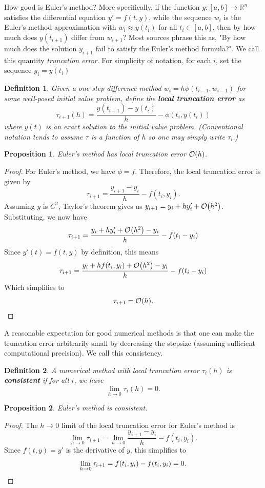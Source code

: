 \documentclass{article}
\newtheorem{definition}{Definition}[section]
\newtheorem{proposition}{Proposition}[section]
\newcommand{\R}{\mathbb{R}}
\newcommand{\0}{\vb{0}}
\begin{document}
How good is Euler's method? More specifically, if the function $y: [a, b]\to\R^n$ satisfies the differential equation $y' = f(t, y)$, while the sequence $w_i$ is the Euler's method approximation with $w_i \approx y(t_i)$ for all $t_i \in [a,b]$, then by how much does $y(t_{i+1})$ differ from $w_{i+1}$? Most sources phrase this as, "By how much does the solution $y_{i+1}$ fail to satisfy the Euler's method formula?". We call this quantity \emph{truncation error}. For simplicity of notation, for each $i$, set the sequence $y_i = y(t_i)$
\begin{definition}
  Given a one-step difference method $w_i = h\phi(t_{i-1}, w_{i-1})$ for some well-posed initial value problem, define the \textbf{local truncation error} as
  \[\tau_{i+1}(h) = \frac{y(t_{i+1}) - y(t_i)}{h} - \phi(t_i, y(t_i))\]
  where $y(t)$ is an exact solution to the initial value problem. (Conventional notation tends to assume $\tau$ is a function of $h$ so one may simply write $\tau_i$.)
\end{definition}

\begin{proposition}
  Euler's method has local truncation error $\order{h}$.
\end{proposition}
\begin{proof}
  For Euler's method, we have $\phi = f$. Therefore, the local truncation error is given by
  \[\tau_{i+1} = \frac{y_{i+1} - y_i}{h} - f(t_i, y_i).\]
  Assuming $y$ is $C^2$, Taylor's theorem gives us $y_{i+1} = y_i + hy'_i + \order{h^2}$. Substituting, we now have
  \[\tau_{i+1} = \frac{y_i + hy'_i + \order{h^2} - y_i}{h} - f(t_i - y_i)\]
  Since $y'(t) = f(t, y)$ by definition, this means
  \[\tau_{i+1} = \frac{y_i + hf(t_i, y_i) + \order{h^2} - y_i}{h} - f(t_i - y_i)\]
  Which simplifies to 
  \[\tau_{i+1} = \order{h}.\qedhere\]
\end{proof}

A reasonable expectation for good numerical methods is that one can make the truncation error arbitrarily small by decreasing the stepsize (assuming sufficient computational precision). We call this consistency.
\begin{definition}
  A numerical method with local truncation error $\tau_i(h)$ is \textbf{consistent} if for all $i$, we have
  \[\lim_{h\to0}\tau_i(h) = 0.\]
\end{definition}

\begin{proposition}
  Euler's method is consistent.
\end{proposition}
\begin{proof}
  The $h\to0$ limit of the local truncation error for Euler's method is
  \[\lim_{h\to0}\tau_{i+1} = \lim_{h\to0}\frac{y_{i+1} - y_i}{h} - f(t_i, y_i).\]
  Since $f(t, y) = y'$ is the derivative of $y$, this simplifies to
  \[\lim_{h\to0}\tau_{i+1} = f(t_i, y_i) - f(t_i, y_i)=0.\qedhere\]
\end{proof}
\end{document}
